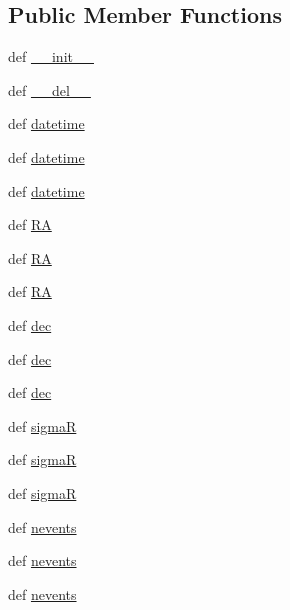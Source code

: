 \subsection*{Public Member Functions}
\begin{DoxyCompactItemize}
\item 
def \hyperlink{classtest__inherit_1_1_event_ac1a0c9e92e19c1f9fd5e01d61947d05f}{\-\_\-\-\_\-init\-\_\-\-\_\-}
\item 
def \hyperlink{classtest__inherit_1_1_event_a724b1466524a0496c603051d8cfa1103}{\-\_\-\-\_\-del\-\_\-\-\_\-}
\item 
def \hyperlink{classtest__inherit_1_1_event_a36aa7bde7252d55aa750aab1a99e082b}{datetime}
\item 
def \hyperlink{classtest__inherit_1_1_event_a36aa7bde7252d55aa750aab1a99e082b}{datetime}
\item 
def \hyperlink{classtest__inherit_1_1_event_a36aa7bde7252d55aa750aab1a99e082b}{datetime}
\item 
def \hyperlink{classtest__inherit_1_1_event_a612fca9f9bff0c8a94f50f6651734554}{R\-A}
\item 
def \hyperlink{classtest__inherit_1_1_event_a612fca9f9bff0c8a94f50f6651734554}{R\-A}
\item 
def \hyperlink{classtest__inherit_1_1_event_a612fca9f9bff0c8a94f50f6651734554}{R\-A}
\item 
def \hyperlink{classtest__inherit_1_1_event_a55b4bedbc886eb77cfac7771850362ed}{dec}
\item 
def \hyperlink{classtest__inherit_1_1_event_a55b4bedbc886eb77cfac7771850362ed}{dec}
\item 
def \hyperlink{classtest__inherit_1_1_event_a55b4bedbc886eb77cfac7771850362ed}{dec}
\item 
def \hyperlink{classtest__inherit_1_1_event_a49b568e72d6286dc6902f657942031ac}{sigma\-R}
\item 
def \hyperlink{classtest__inherit_1_1_event_a49b568e72d6286dc6902f657942031ac}{sigma\-R}
\item 
def \hyperlink{classtest__inherit_1_1_event_a49b568e72d6286dc6902f657942031ac}{sigma\-R}
\item 
def \hyperlink{classtest__inherit_1_1_event_aa3d666daea0992b79fac728a2220a375}{nevents}
\item 
def \hyperlink{classtest__inherit_1_1_event_aa3d666daea0992b79fac728a2220a375}{nevents}
\item 
def \hyperlink{classtest__inherit_1_1_event_aa3d666daea0992b79fac728a2220a375}{nevents}
\item 

\end{DoxyCompactItemize}
